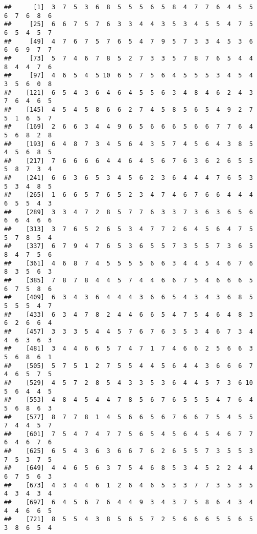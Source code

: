 \documentclass[
]{book}
\begin{document}
\begin{verbatim}
##      [1]  3  7  5  3  6  8  5  5  5  6  5  8  4  7  7  6  4  5  5  6  7  6  8  6
##     [25]  6  6  7  5  7  6  3  3  4  4  3  5  3  4  5  5  4  7  5  6  5  4  5  7
##     [49]  4  7  6  7  5  7  6  5  4  7  9  5  7  3  3  4  5  3  6  6  6  9  7  7
##     [73]  5  7  4  6  7  8  5  2  7  3  3  5  7  8  7  6  5  4  4  8  4  4  7  6
##     [97]  4  6  5  4  5 10  6  5  7  5  6  4  5  5  5  3  4  5  4  3  5  6  0  8
##    [121]  6  5  4  3  6  4  6  4  5  5  6  3  4  8  4  6  2  4  3  7  6  4  6  5
##    [145]  4  5  4  5  8  6  6  2  7  4  5  8  5  6  5  4  9  2  7  5  1  6  5  7
##    [169]  2  6  6  3  4  4  9  6  5  6  6  6  5  6  6  7  7  6  4  5  6  8  2  8
##    [193]  6  4  8  7  3  4  5  6  4  3  5  7  4  5  6  4  3  8  5  4  5  6  8  5
##    [217]  7  6  6  6  6  4  4  6  4  5  6  7  6  3  6  2  6  5  5  5  8  7  3  4
##    [241]  6  6  3  6  5  3  4  5  6  2  3  6  4  4  4  7  6  5  3  5  3  4  8  5
##    [265]  1  6  6  5  7  6  5  2  3  4  7  4  6  7  6  6  4  4  4  6  5  5  4  3
##    [289]  3  3  4  7  2  8  5  7  7  6  3  3  7  3  6  3  6  5  6  6  6  4  6  6
##    [313]  3  7  6  5  2  6  5  3  4  7  7  2  6  4  5  6  4  7  5  5  7  8  5  4
##    [337]  6  7  9  4  7  6  5  3  6  5  5  7  3  5  5  7  3  6  5  8  4  7  5  6
##    [361]  4  6  8  7  4  5  5  5  5  6  6  3  4  4  5  4  6  7  6  8  3  5  6  3
##    [385]  7  8  7  8  4  4  5  7  4  4  6  6  7  5  4  6  6  6  5  6  7  5  8  6
##    [409]  6  3  4  3  6  4  4  4  3  6  6  5  4  3  4  3  6  8  5  5  5  5  4  7
##    [433]  6  3  4  7  8  2  4  4  6  6  5  4  7  5  4  6  4  8  3  6  2  6  6  4
##    [457]  3  3  3  5  4  4  5  7  6  7  6  3  5  3  4  6  7  3  4  4  6  3  6  3
##    [481]  3  4  4  6  6  5  7  4  7  1  7  4  6  6  2  5  6  6  3  5  6  8  6  1
##    [505]  5  7  5  1  2  7  5  5  4  4  5  6  4  4  3  6  6  6  7  4  6  5  7  5
##    [529]  4  5  7  2  8  5  4  3  3  5  3  6  4  4  5  7  3  6 10  5  6  4  4  5
##    [553]  4  8  4  5  4  4  7  8  5  6  7  6  5  5  5  4  7  6  4  5  6  8  6  3
##    [577]  8  7  7  8  1  4  5  6  6  5  6  7  6  6  7  5  4  5  5  7  4  4  5  7
##    [601]  7  5  4  7  4  7  7  5  6  5  4  5  6  4  5  4  6  7  7  6  4  6  7  6
##    [625]  6  5  4  3  6  3  6  6  7  6  2  6  5  5  7  3  5  5  3  7  5  3  7  5
##    [649]  4  4  6  5  6  3  7  5  4  6  8  5  3  4  5  2  2  4  4  6  7  5  6  3
##    [673]  4  3  4  4  6  1  2  6  4  6  5  3  3  7  7  3  5  3  5  4  3  4  3  4
##    [697]  6  4  5  6  7  6  4  4  9  3  4  3  7  5  8  6  4  3  4  4  4  6  6  5
##    [721]  8  5  5  4  3  8  5  6  5  7  2  5  6  6  6  5  5  6  5  3  8  6  5  4

\end{verbatim}
\end{document}
